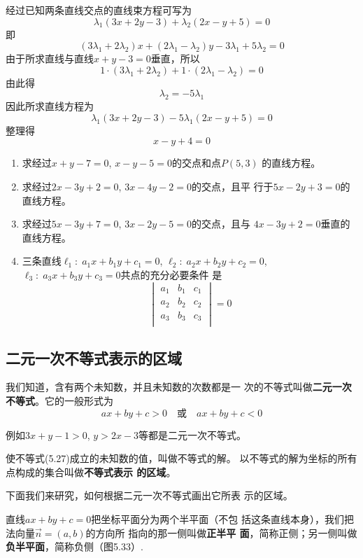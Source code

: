 \begin{solution}
    经过已知两条直线交点的直线束方程可写为
\[\lambda_1(3x+2y-3)+\lambda_2(2x-y+5)=0\]
即
\[(3\lambda_1+2\lambda_2)x+(2\lambda_1-\lambda_2)y-3\lambda_1+5\lambda_2=0\]
由于所求直线与直线$x+y-3=0$垂直，所以
\[1\cdot (3\lambda_1+2\lambda_2)+1\cdot (2\lambda_1-\lambda_2)=0\]
由此得
\[\lambda_2=-5\lambda_1\]
因此所求直线方程为
\[\lambda_1(3x+2y-3)-5\lambda_1(2x-y+5)=0\]
整理得
\[x-y+4=0\]
\end{solution}

\begin{ex}
\begin{enumerate}
    \item 求经过$x+y-7=0$, $x-y-5=0$的交点和点$P(5,3)$
    的直线方程。
    \item 求经过$2x-3y+2=0$, $3x-4y-2=0$的交点，且平
    行于$5x-2y+3=0$的直线方程。
    \item 求经过$5x-3y+7=0$, $3x-2y-5=0$的交点，且与
    $4x-3y+2=0$垂直的直线方程。
    \item 三条直线$\ell_1:\; a_1x+b_1y+c_1=0$, $\ell_2:\; a_2x+b_2y+c_2=0$, $\ell_3:\; a_3x+b_3y+c_3=0$共点的充分必要条件
    是
\[\begin{vmatrix}
    a_1&b_1&c_1\\
    a_2&b_2&c_2\\
    a_3&b_3&c_3\\
\end{vmatrix}=0\]
\end{enumerate}
\end{ex}

\subsection{二元一次不等式表示的区域}
我们知道，含有两个未知数，并且未知数的次数都是一
次的不等式叫做\textbf{二元一次不等式}。它的一般形式为
\begin{equation}
    ax+by+c>0\quad \text{或}\quad ax+by+c<0
\end{equation}

例如$3x+y-1>0$, $y>2x-3$等都是二元一次不等式。

使不等式(5.27)成立的未知数的值，叫做不等式的解。
以不等式的解为坐标的所有点构成的集合叫做\textbf{不等式表示
的区域}。

下面我们来研究，如何根据二元一次不等式画出它所表
示的区域。

直线$ax+by+c=0$把坐标平面分为两个半平面（不包
括这条直线本身），我们把
法向量$\vec{n}=(a,b)$的方向所
指向的那一侧叫做\textbf{正半平
面}，简称正侧；另一侧叫做
\textbf{负半平面}，简称负侧（图5.33）.

